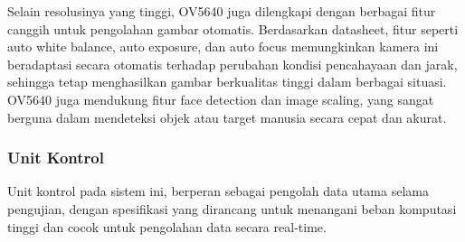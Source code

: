 Selain resolusinya yang tinggi, OV5640 juga dilengkapi dengan berbagai fitur canggih untuk pengolahan gambar otomatis. Berdasarkan datasheet, fitur seperti auto white balance, auto exposure, dan auto focus memungkinkan kamera ini beradaptasi secara otomatis terhadap perubahan kondisi pencahayaan dan jarak, sehingga tetap menghasilkan gambar berkualitas tinggi dalam berbagai situasi. OV5640 juga mendukung fitur face detection dan image scaling, yang sangat berguna dalam mendeteksi objek atau target manusia secara cepat dan akurat.

\subsubsection{Unit Kontrol}
\label{subsubsec:UnitKontrol}


Unit kontrol pada sistem ini, berperan sebagai pengolah data utama selama pengujian, dengan spesifikasi yang dirancang untuk menangani beban komputasi tinggi dan cocok untuk pengolahan data secara real-time.


